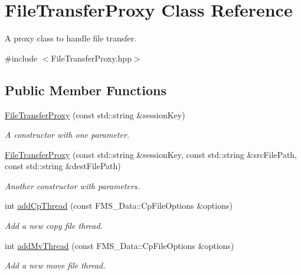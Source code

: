 \hypertarget{classFileTransferProxy}{
\section{FileTransferProxy Class Reference}
\label{classFileTransferProxy}
}


A proxy class to handle file transfer.  




{\ttfamily \#include $<$FileTransferProxy.hpp$>$}

\subsection*{Public Member Functions}
\begin{DoxyCompactItemize}
\item 
\hyperlink{classFileTransferProxy_ab1b4391127778b89aa9f4d09ecea60ba}{FileTransferProxy} (const std::string \&sessionKey)
\begin{DoxyCompactList}\small\item\em A constructor with one parameter. \item\end{DoxyCompactList}\item 
\hyperlink{classFileTransferProxy_a16fe987d0edac5921bff6913099aa5c5}{FileTransferProxy} (const std::string \&sessionKey, const std::string \&srcFilePath, const std::string \&destFilePath)
\begin{DoxyCompactList}\small\item\em Another constructor with parameters. \item\end{DoxyCompactList}\item 
int \hyperlink{classFileTransferProxy_a3260414718394057da542686e5cddda3}{addCpThread} (const FMS\_\-Data::CpFileOptions \&options)
\begin{DoxyCompactList}\small\item\em Add a new copy file thread. \item\end{DoxyCompactList}\item 
int \hyperlink{classFileTransferProxy_a37685d93ddfef009ee4ea0e8925cd265}{addMvThread} (const FMS\_\-Data::CpFileOptions \&options)
\begin{DoxyCompactList}\small\item\em Add a new move file thread. \item\end{DoxyCompactList}\item 

\end{DoxyCompactItemize}
